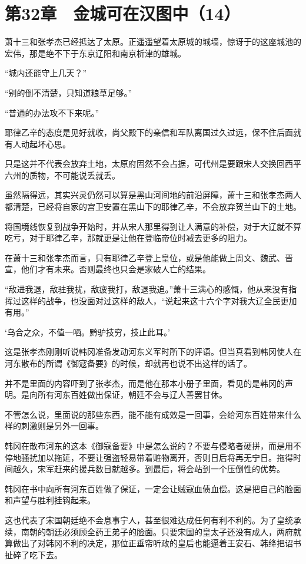 \section{第32章　金城可在汉图中（14）}

萧十三和张孝杰已经抵达了太原。正遥遥望着太原城的城墙，惊讶于的这座城池的宏伟，那是绝不下于东京辽阳和南京析津的雄城。

“城内还能守上几天？”

“别的倒不清楚，只知道粮草足够。”

“普通的办法攻不下来呢。”

耶律乙辛的态度是见好就收，尚父殿下的亲信和军队离国过久过远，保不住后面就有人动起坏心思。

只是这并不代表会放弃土地，太原府固然不会占据，可代州是要跟宋人交换回西平六州的质物，不可能说丢就丢。

虽然隔得远，其实兴灵仍然可以算是黑山河间地的前沿屏障，萧十三和张孝杰两人都清楚，已经将自家的宫卫安置在黑山下的耶律乙辛，不会放弃贺兰山下的土地。

将国境线恢复到战争开始时，并从宋人那里得到让人满意的补偿，对于大辽就不算吃亏，对于耶律乙辛，那就更是让他在登临帝位时减去更多的阻力。

在萧十三和张孝杰而言，只有耶律乙辛登上皇位，或是他能做上周文、魏武、晋宣，他们才有未来。否则最终也只会是家破人亡的结果。

“敌进我退，敌驻我扰，敌疲我打，敌退我追。”萧十三满心的感慨，他从来没有指挥过这样的战争，也没面对过这样的敌人，“说起来这十六个字对我大辽全民更加有用。”

‘乌合之众，不值一哂。黔驴技穷，技止此耳。’

这是张孝杰刚刚听说韩冈准备发动河东义军时所下的评语。但当真看到韩冈使人在河东散布的所谓《御寇备要》的时候，却就再也说不出这样的话了。

并不是里面的内容吓到了张孝杰，而是他在那本小册子里面，看见的是韩冈的声明。是向所有河东百姓做出保证，朝廷不会与辽人善罢甘休。

不管怎么说，里面说的那些东西，能不能有成效是一回事，会给河东百姓带来什么样的刺激则是另外一回事。

韩冈在散布河东的这本《御寇备要》中是怎么说的？不要与侵略者硬拼，而是用不停地骚扰加以拖延，不要让强盗轻易带着赃物离开，否则日后将再无宁日。拖得时间越久，宋军赶来的援兵数目就越多。到最后，将会站到一个压倒性的优势。

韩冈在书中向所有河东百姓做了保证，一定会让贼寇血债血偿。这是把自己的脸面和声望与胜利挂钩起来。

这也代表了宋国朝廷绝不会息事宁人，甚至很难达成任何有利不利的。为了皇统承续，南朝的朝廷必须顾全药王弟子的脸面。只要宋国的皇太子还没有成人，两府就算做出了对韩冈不利的决定，那位正垂帘听政的皇后也能逼着王安石、韩绛把诏书扯碎了吃下去。

